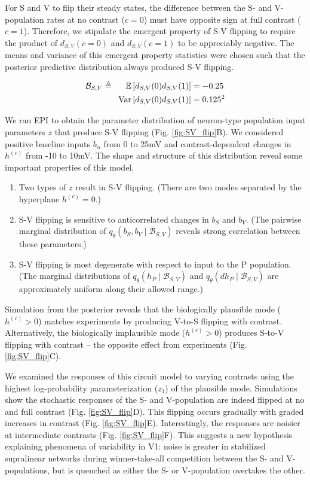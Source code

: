 \documentclass[11pt]{article}
\begin{document}
For S and V to flip their steady states, the difference between the S- and V-population rates at no contrast ($c=0$) must have opposite sign at full contrast ($c=1$).  Therefore, we stipulate the emergent property of S-V flipping to require the product of $d_{S,V}(c=0)$ and $d_{S,V}(c=1)$ to be appreciably negative.  The means and variance of this emergent property statistics were chosen such that the posterior predictive distribution always produced S-V flipping.

\begin{equation}
\begin{split}
\mathcal{B}_{S,V} \triangleq \text{\hspace{.5cm}} \mathbb{E}\left[ d_{S,V}(0)d_{S,V}(1) \right] &= -0.25 \\ 
\text{Var}\left[ d_{S,V}(0)d_{S,V}(1)\right] &=  0.125^2
\end{split}
\end{equation}

We ran EPI to obtain the parameter distribution of neuron-type population input parameters $z$ that produce S-V flipping (Fig. \ref{fig:SV_flip}B).
We considered positive baseline inputs $b_\alpha$ from 0 to 25mV and contrast-dependent changes in $h^{(c)}$ from -10 to 10mV.
The shape and structure of this distribution reveal some important properties of this model.
\begin{enumerate}
\item Two types of $z$ result in S-V flipping. (There are two modes separated by the hyperplane $h^{(c)} = 0$.)
\item S-V flipping is sensitive to anticorrelated changes in $b_S$ and $b_V$.  (The pairwise marginal distribution of $q_\theta(b_S, b_V \mid \mathcal{B}_{S,V})$ reveals strong correlation between these parameters.)
\item S-V flipping is most degenerate with respect to input to the P population. (The marginal distributions of $q_\theta(h_P \mid \mathcal{B}_{S,V})$ and  $q_\theta(dh_P \mid \mathcal{B}_{S,V})$ are approximately uniform along their allowed range.)
\end{enumerate}
Simulation from the posterior reveals that the biologically plausible mode ($h^{(c)} > 0$) matches experiments by producing V-to-S flipping with contrast.
Alternatively, the biologically implausible mode ($h^{(c)} > 0$) produces S-to-V flipping with contrast -- the opposite effect from experiments (Fig. \ref{fig:SV_flip}C).

We examined the responses of this circuit model to varying contrasts using the highest log-probability parameterization ($z_1$) of the plausible mode.
Simulations show the stochastic responses of the S- and V-population are indeed flipped at no and full contrast (Fig. \ref{fig:SV_flip}D).
This flipping occurs gradually with graded increases in contrast (Fig. \ref{fig:SV_flip}E).
Interestingly, the responses are noisier at intermediate contrasts (Fig. \ref{fig:SV_flip}F).
This suggests a new hypothesis explaining phenomena of variability in V1: noise is greater in stabilized supralinear networks during winner-take-all competition between the S- and V- populations, but is quenched as either the S- or V-population overtakes the other.
\end{document}
